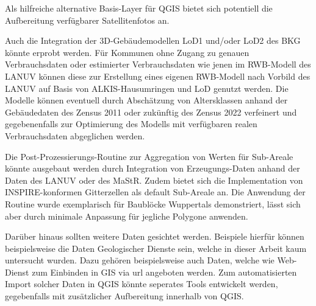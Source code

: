		Als hilfreiche alternative Basis-Layer für QGIS bietet sich potentiell die Aufbereitung verfügbarer Satellitenfotos an. 
		
		Auch die Integration der 3D-Gebäudemodellen LoD1 und/oder LoD2 des BKG könnte erprobt werden. Für Kommunen ohne Zugang zu genauen Verbrauchsdaten oder estimierter Verbrauchsdaten wie jenen im RWB-Modell des LANUV können diese zur Erstellung eines eigenen RWB-Modell nach Vorbild des LANUV auf Basis von ALKIS-Hausumringen und LoD genutzt werden. Die Modelle können eventuell durch Abschätzung von Altersklassen anhand der Gebäudedaten des Zensus 2011 oder zukünftig des Zensus 2022 verfeinert und gegebenenfalls zur Optimierung des Modells mit verfügbaren realen Verbrauchsdaten abgeglichen werden. 
		
		Die Post-Prozessierungs-Routine zur Aggregation von Werten für Sub-Areale könnte ausgebaut werden durch Integration von Erzeugungs-Daten anhand der Daten des LANUV oder des MaStR. Zudem bietet sich die Implementation von INSPIRE-konformen Gitterzellen als default Sub-Areale an. Die Anwendung der Routine wurde exemplarisch für Baublöcke Wuppertals demonstriert, lässt sich aber durch minimale Anpassung für jegliche Polygone anwenden. 
		
		Darüber hinaus sollten weitere Daten gesichtet werden. Beispiele hierfür können beispielsweise die Daten Geologischer Dienste sein, welche in dieser Arbeit kaum untersucht wurden. Dazu gehören beispielsweise auch Daten, welche wie Web-Dienst zum Einbinden in GIS via url angeboten werden. Zum automatisierten Import solcher Daten in QGIS könnte seperates Tools entwickelt werden, gegebenfalls mit zusätzlicher Aufbereitung innerhalb von QGIS. 
		
		